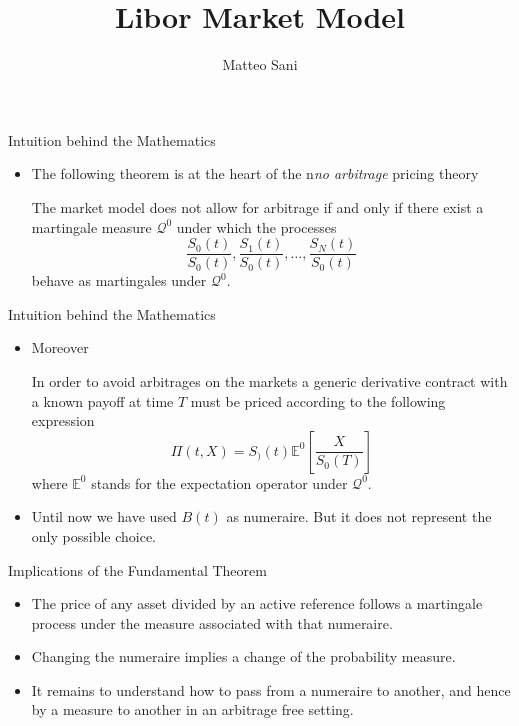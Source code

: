 \documentclass{beamer}
\title{Libor Market Model}
\author{Matteo Sani}
\begin{document}
	\begin{frame}[plain]
		\maketitle
	\end{frame}


\begin{frame}{Intuition behind the Mathematics}
	\begin{itemize}
		\item The following theorem is at the heart of the n\emph{no arbitrage} pricing theory
		\begin{block}{}
		The market model does not allow for arbitrage if and only if there exist a martingale measure $\mathcal{Q}^0$ under which the processes
		\begin{equation}
		\frac{S_0(t)}{S_0(t)},\frac{S_1(t)}{S_0(t)},\ldots,\frac{S_N(t)}{S_0(t)}
		\end{equation}
		behave as martingales under $\mathcal{Q}^0$.
		\end{block}
	\end{itemize}
\end{frame}

\begin{frame}{Intuition behind the Mathematics}
	\begin{itemize}
		\item Moreover
		\begin{block}{}
			In order to avoid arbitrages on the markets a generic derivative contract with a known payoff at time $T$ must be priced according to the following expression
			\begin{equation}
				\Pi(t, X) = S_)(t)\mathbb{E}^0\left[\frac{X}{S_0(T)}\right]
			\end{equation}
			where $\mathbb{E}^0$ stands for the expectation operator under $\mathcal{Q}^0$.
		\end{block}
	\item Until now we have used $B(t)$ as numeraire. But it does not represent the only possible choice.
	\end{itemize}
\end{frame}

\begin{frame}{Implications of the Fundamental Theorem}
	\begin{itemize}
		\item The price of any asset divided by an active reference follows a martingale process under the measure associated with that numeraire.
		\item Changing the numeraire implies a change of the probability measure.
		\item It remains to understand how to pass from a numeraire to another, and hence by a measure to another in an arbitrage free setting.
	\end{itemize}
\end{frame}
\end{document}
